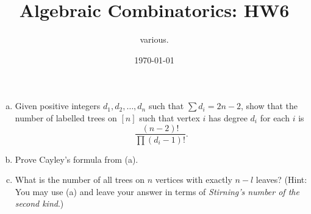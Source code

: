 \documentclass[11pt]{article}
\title{Algebraic Combinatorics: HW6}
\author{various.}
\date{\today}
\begin{document}
\maketitle
\begin{quest}[\textcolor{red}{Trees with prescribed degrees and Cayley's formula}]
    \begin{enumerate}[(a)]\phantom{0}

        \item Given positive integers $d_1,d_2,\dots,d_n$ such that $\sum d_i=2n-2$, show that the number of labelled trees on $[n]$ such that vertex $i$ has degree $d_i$ for each $i$ is \[\frac{(n-2)!}{\prod(d_i-1)!}.\]
        \item Prove Cayley's formula from (a).
        \item What is the number of all trees on $n$ vertices with exactly $n-l$ leaves? (Hint: You may use (a) and leave your answer in terms of \textit{Stirning's number of the second kind}.)
    \end{enumerate}
\end{quest}
\end{document}

